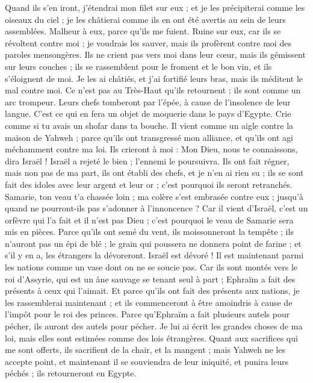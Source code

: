 \begin{multicols}{2}
Quand ils s’en iront, j'étendrai mon filet sur eux ; et je les précipiterai comme les oiseaux du ciel ; je les châtierai comme ils en ont été avertis au sein de leurs assemblées.
Malheur à eux, parce qu'ils me fuient. Ruine sur eux, car ils se révoltent contre moi ; je voudrais les sauver, mais ils profèrent contre moi des paroles mensongères.
Ils ne crient pas vers moi dans leur cœur, mais ils gémissent sur leurs couches ; ils se rassemblent pour le froment et le bon vin, et ils s’éloignent de moi.
Je les ai châtiés, et j'ai fortifié leurs bras, mais ils méditent le mal contre moi.
Ce n’est pas au Très-Haut qu’ils retournent ; ils sont comme un arc trompeur. Leurs chefs tomberont par l’épée, à cause de l’insolence de leur langue. C’est ce qui en fera un objet de moquerie dans le pays d'Egypte.
\VerseOne{}Crie comme si tu avais un shofar dans ta bouche. Il vient comme un aigle contre la maison de Yahweh ; parce qu’ils ont transgressé mon alliance, et qu’ils ont agi méchamment contre ma loi.
Ils crieront à moi : Mon Dieu, nous te connaissons, dira Israël !
Israël a rejeté le bien ; l'ennemi le poursuivra.
Ils ont fait régner, mais non pas de ma part, ils ont établi des chefs, et je n'en ai rien su ; ils se sont fait des idoles avec leur argent et leur or ; c'est pourquoi ils seront retranchés.
Samarie, ton veau t'a chassée loin ; ma colère s'est embrasée contre eux ; jusqu'à quand ne pourront-ils pas s'adonner à l'innoncence ?
Car il vient d'Israël, c'est un orfèvre qui l'a fait et il n'est pas Dieu ; c'est pourquoi le veau de Samarie sera mis en pièces.
Parce qu'ils ont semé du vent, ils moissonneront la tempête ; ils n’auront pas un épi de blé ; le grain qui poussera ne donnera point de farine ; et s'il y en a, les étrangers la dévoreront.
Israël est dévoré ! Il est maintenant parmi les nations comme un vase dont on ne se soucie pas.
Car ils sont montés vers le roi d'Assyrie, qui est un âne sauvage se tenant seul à part ; Ephraïm a fait des présents à ceux qui l'aimait.
Et parce qu'ils ont fait des présents aux nations, je les rassemblerai maintenant ; et ils commenceront à être amoindris à cause de l'impôt pour le roi des princes.
Parce qu'Ephraïm a fait plusieurs autels pour pécher, ils auront des autels pour pécher.
Je lui ai écrit les grandes choses de ma loi, mais elles sont estimées comme des lois étrangères.
Quant aux sacrifices qui me sont offerts, ils sacrifient de la chair, et la mangent ; mais Yahweh ne les accepte point, et maintenant il se souviendra de leur iniquité, et punira leurs péchés ; ils retourneront en Egypte.

\end{multicols}

